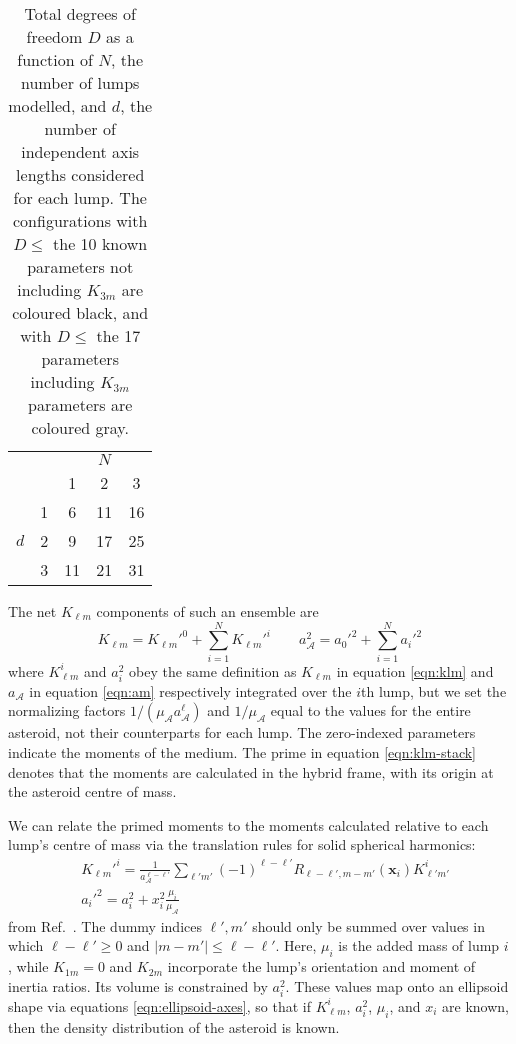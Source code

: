 \begin{table}
  \centering
  \begin{tabular}{cc|ccc}
    \hline \hline
        &  & & $N$ &  \\
        &  & 1  & 2  & 3  \\ \hline 
        & 1& \cellcolor{black}\color{white} 6 & \cellcolor{gray}\color{white} 11 & \cellcolor{gray}\color{white} 16\\
    $d$ & 2& \cellcolor{black}\color{white} 9 & \cellcolor{gray}\color{white} 17 & 25 \\
        & 3& \cellcolor{gray}\color{white}  11 &  21 &  31 \\
    \hline \hline
  \end{tabular}
  \caption{Total degrees of freedom $D$ as a function of $N$, the number of lumps modelled, and $d$, the number of independent axis lengths considered for each lump. The configurations with $D \leq$ the 10 known parameters not including $K_{3m}$ are coloured black, and with $D \leq$ the 17 parameters including $K_{3m}$ parameters are coloured gray.}
  \label{tab:lump-dof}
\end{table}

The net $K_{\ell m}$ components of such an ensemble are
\begin{equation}
  K_{\ell m} = K_{\ell m}'^0 + \sum_{i=1}^N K_{\ell m}'^i \qquad a_\mathcal{A}^2 = a_0'^2 + \sum_{i=1}^N a_i'^2
  \label{eqn:klm-stack}
\end{equation}
where $K_{\ell m}^i$ and $a_i^2$ obey the same definition as $K_{\ell m}$ in equation \ref{eqn:klm} and $a_\mathcal{A}$ in equation \ref{eqn:am} respectively integrated over the $i$th lump, but we set the normalizing factors $1/(\mu_\mathcal{A} a_\mathcal{A}^\ell)$ and $1/\mu_\mathcal{A}$ equal to the values for the entire asteroid, not their counterparts for each lump. The zero-indexed parameters indicate the moments of the medium. The prime in equation \ref{eqn:klm-stack} denotes that the moments are calculated in the hybrid frame, with its origin at the asteroid centre of mass.

We can relate the primed moments to the moments calculated relative to each lump's centre of mass via the translation rules for solid spherical harmonics:
\begin{equation}
  \begin{split}
  & K_{\ell m}'^i = \frac{1}{a_\mathcal{A}^{\ell - \ell'}}\sum_{\ell' m'} (-1)^{\ell - \ell'} R_{\ell - \ell', m - m'}(\bm x_i) K_{\ell' m'}^i\\
  & a_i'^2 = a_i^2 + x_i^2 \frac{\mu_i}{\mu_\mathcal{A}}
  \end{split}
  \label{eqn:translate-klm}
\end{equation}
from Ref.~\cite{Gelderen1998TheSO}. The dummy indices $\ell', m'$ should only be summed over values in which $\ell-\ell' \geq 0$ and $|m-m'| \leq \ell - \ell'$. Here, $\mu_i$ is the added mass of lump $i$, while $K_{1m}=0$ and $K_{2m}$ incorporate the lump's orientation and moment of inertia ratios. Its volume is constrained by $a_i^2$. These values map onto an ellipsoid shape via equations \ref{eqn:ellipsoid-axes}, so that if $K_{\ell m}^i$, $a_i^2$, $\mu_i$, and $x_i$ are known, then the density distribution of the asteroid is known.


